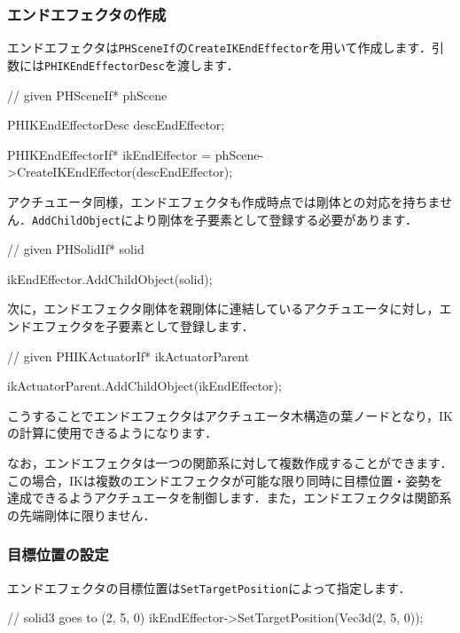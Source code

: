 \subsubsection*{\KLUDGE エンドエフェクタの作成}

\KLUDGE エンドエフェクタは\texttt{PHSceneIf}\KLUDGE の\texttt{CreateIKEndEffector}\KLUDGE を用いて作成します．引数には\texttt{PHIKEndEffectorDesc}\KLUDGE を渡します．
\begin{sourcecode}
// given PHSceneIf* phScene

PHIKEndEffectorDesc descEndEffector;

PHIKEndEffectorIf* ikEndEffector
  = phScene->CreateIKEndEffector(descEndEffector);
\end{sourcecode}

\KLUDGE アクチュエータ同様，エンドエフェクタも作成時点では剛体との対応を持ちません．\texttt{AddChildObject}\KLUDGE により剛体を子要素として登録する必要があります．
\begin{sourcecode}
// given PHSolidIf* solid

ikEndEffector.AddChildObject(solid);
\end{sourcecode}

\KLUDGE 次に，エンドエフェクタ剛体を親剛体に連結しているアクチュエータに対し，エンドエフェクタを子要素として登録します．
\begin{sourcecode}
// given PHIKActuatorIf* ikActuatorParent

ikActuatorParent.AddChildObject(ikEndEffector);
\end{sourcecode}
\KLUDGE こうすることでエンドエフェクタはアクチュエータ木構造の葉ノードとなり，IK\KLUDGE の計算に使用できるようになります．

\KLUDGE なお，エンドエフェクタは一つの関節系に対して複数作成することができます．この場合，IK\KLUDGE は複数のエンドエフェクタが可能な限り同時に目標位置・姿勢を達成できるようアクチュエータを制御します．また，エンドエフェクタは関節系の先端剛体に限りません．


\subsubsection*{\KLUDGE 目標位置の設定}

\KLUDGE エンドエフェクタの目標位置は\texttt{SetTargetPosition}\KLUDGE によって指定します．
\begin{sourcecode}
// solid3 goes to (2, 5, 0)
ikEndEffector->SetTargetPosition(Vec3d(2, 5, 0)); 
\end{sourcecode}

